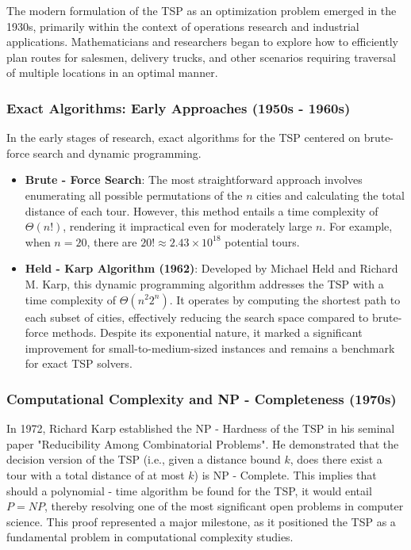 \documentclass[acmsmall]{acmart}
\begin{document}
	The modern formulation of the TSP as an optimization problem emerged in the 1930s, primarily within the context of operations research and industrial applications. Mathematicians and researchers began to explore how to efficiently plan routes for salesmen, delivery trucks, and other scenarios requiring traversal of multiple locations in an optimal manner.
	
	\subsubsection{Exact Algorithms: Early Approaches (1950s - 1960s)}
	
	\hspace{1.2em}In the early stages of research, exact algorithms for the TSP centered on brute-force search and dynamic programming.
	\begin{itemize}
		\item \textbf{Brute - Force Search}: The most straightforward approach involves enumerating all possible permutations of the \(n\) cities and calculating the total distance of each tour. However, this method entails a time complexity of \(\Theta(n!)\), rendering it impractical even for moderately large \(n\). For example, when \(n = 20\), there are \(20!\approx 2.43\times 10^{18}\) potential tours\cite{J2014The}.
		
		\item \textbf{Held - Karp Algorithm (1962)}: Developed by Michael Held and Richard M. Karp, this dynamic programming algorithm addresses the TSP with a time complexity of \(\Theta(n^2 2^n)\)\cite{held1962dynamic}. It operates by computing the shortest path to each subset of cities, effectively reducing the search space compared to brute-force methods. Despite its exponential nature, it marked a significant improvement for small-to-medium-sized instances and remains a benchmark for exact TSP solvers.
	\end{itemize}
	
	\subsubsection{Computational Complexity and NP - Completeness (1970s)}
	
	\hspace{1.2em}In 1972, Richard Karp established the NP - Hardness of the TSP in his seminal paper "Reducibility Among Combinatorial Problems"\cite{karp1972reducibility}. He demonstrated that the decision version of the TSP (i.e., given a distance bound \(k\), does there exist a tour with a total distance of at most \(k\)) is NP - Complete. This implies that should a polynomial - time algorithm be found for the TSP, it would entail \(P = NP\), thereby resolving one of the most significant open problems in computer science. This proof represented a major milestone, as it positioned the TSP as a fundamental problem in computational complexity studies.
	
\end{document}
